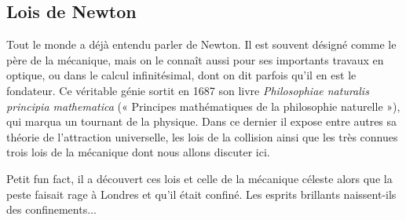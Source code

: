 \documentclass{article}
\begin{document}
\subsection{Lois de Newton}
Tout le monde a déjà entendu parler de Newton. Il est souvent désigné comme le père de la mécanique, mais on le connaît aussi pour ses importants travaux en optique, ou dans le calcul infinitésimal, dont on dit parfois qu'il en est le fondateur.
Ce véritable génie sortit en 1687 son livre \textit{Philosophiae naturalis principia mathematica} (« Principes mathématiques de la philosophie naturelle »), qui marqua un tournant de la physique. Dans ce dernier il expose entre autres sa théorie de l'attraction universelle, les lois de la collision ainsi que les très connues trois lois de la mécanique dont nous allons discuter ici. 

Petit fun fact, il a découvert ces lois et celle de la mécanique céleste alors que la peste faisait rage à Londres et qu'il était confiné. Les esprits brillants naissent-ils des confinements...
\end{document}
